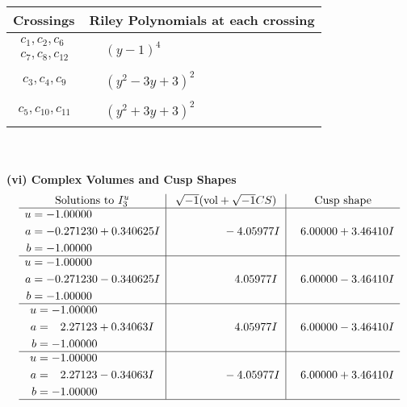 \documentclass[1p]{elsarticle_modified}
\theoremstyle{definition}
\newcommand{\I}{\sqrt{-1}}
\begin{document}
\begin{tabular}{m{50pt}|m{274pt}}
Crossings & \hspace{64pt}Riley Polynomials at each crossing \\
\hline $$\begin{aligned}c_{1},c_{2},c_{6}\\c_{7},c_{8},c_{12}\end{aligned}$$&$\begin{aligned}
&(y-1)^4
\end{aligned}$\\
\hline $$\begin{aligned}c_{3},c_{4},c_{9}\end{aligned}$$&$\begin{aligned}
&(y^2-3 y+3)^2
\end{aligned}$\\
\hline $$\begin{aligned}c_{5},c_{10},c_{11}\end{aligned}$$&$\begin{aligned}
&(y^2+3 y+3)^2
\end{aligned}$\\
\hline
\end{tabular}\\~\\
\newpage\flushleft \textbf{(vi) Complex Volumes and Cusp Shapes}
$$\begin{array}{c|c|c}  
\text{Solutions to }I^u_{3}& \I (\text{vol} + \sqrt{-1}CS) & \text{Cusp shape}\\
 \hline 
\begin{aligned}
u &= -1.00000\phantom{ +0.000000I} \\
a &= -0.271230 + 0.340625 I \\
b &= -1.00000\phantom{ +0.000000I}\end{aligned}
 & \phantom{-0.000000 } -4.05977 I & \phantom{-}6.00000 + 3.46410 I \\ \hline\begin{aligned}
u &= -1.00000\phantom{ +0.000000I} \\
a &= -0.271230 - 0.340625 I \\
b &= -1.00000\phantom{ +0.000000I}\end{aligned}
 & \phantom{-0.000000 -}4.05977 I & \phantom{-}6.00000 - 3.46410 I \\ \hline\begin{aligned}
u &= -1.00000\phantom{ +0.000000I} \\
a &= \phantom{-}2.27123 + 0.34063 I \\
b &= -1.00000\phantom{ +0.000000I}\end{aligned}
 & \phantom{-0.000000 -}4.05977 I & \phantom{-}6.00000 - 3.46410 I \\ \hline\begin{aligned}
u &= -1.00000\phantom{ +0.000000I} \\
a &= \phantom{-}2.27123 - 0.34063 I \\
b &= -1.00000\phantom{ +0.000000I}\end{aligned}
 & \phantom{-0.000000 } -4.05977 I & \phantom{-}6.00000 + 3.46410 I\\
 \hline 
 \end{array}$$\newpage\newpage\renewcommand{\arraystretch}{1}
\end{document}
